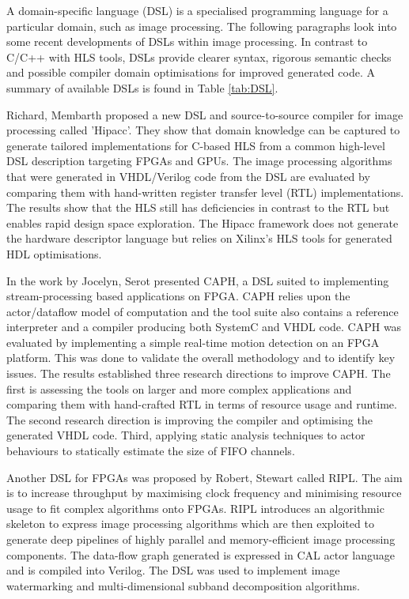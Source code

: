 


A domain-specific language (DSL) is a specialised programming language for a particular domain, such as image processing.  The following paragraphs look into some recent developments of DSLs within image processing. In contrast to C/C++ with HLS tools, DSLs provide clearer syntax, rigorous semantic checks and possible compiler domain optimisations for improved generated code. A summary of available DSLs is found in Table \ref{tab:DSL}.


Richard, Membarth \etal \cite{MemReiHan16} proposed a new DSL and source-to-source compiler for image processing called 'Hipacc'. They show that domain knowledge can be captured to generate tailored implementations for C-based HLS from a common high-level DSL description targeting FPGAs and GPUs. The image processing algorithms that were generated in VHDL/Verilog code from the DSL are evaluated by comparing them with hand-written register transfer level (RTL) implementations. The results show that the HLS still has deficiencies in contrast to the RTL but enables rapid design space exploration. The Hipacc framework does not generate the hardware descriptor language but relies on Xilinx's HLS tools for generated HDL optimisations.

In the work by Jocelyn, Serot \etal \cite{SerBerAhm11} presented CAPH, a DSL suited to implementing stream-processing based applications on FPGA. CAPH relies upon the actor/dataflow model of computation and the tool suite also contains a reference interpreter and a compiler producing both SystemC and VHDL code. CAPH was evaluated by implementing a simple real-time motion detection on an FPGA platform. This was done to validate the overall methodology and to identify key issues. The results established three research directions to improve CAPH. The first is assessing the tools on larger and more complex applications and comparing them with hand-crafted RTL in terms of resource usage and runtime. The second research direction is improving the compiler and optimising the generated VHDL code. Third, applying static analysis techniques to actor behaviours to statically estimate the size of FIFO channels.


Another DSL for FPGAs was proposed by Robert, Stewart \etal\cite{SteDunMic18} called RIPL. The aim is to increase throughput by maximising clock frequency and minimising resource usage to fit complex algorithms onto FPGAs. RIPL introduces an algorithmic skeleton to express image processing algorithms which are then exploited to generate deep pipelines of highly parallel and memory-efficient image processing components. The data-flow graph generated is expressed in CAL actor language and is compiled into Verilog. The DSL was used to implement image watermarking and multi-dimensional subband decomposition algorithms. 

